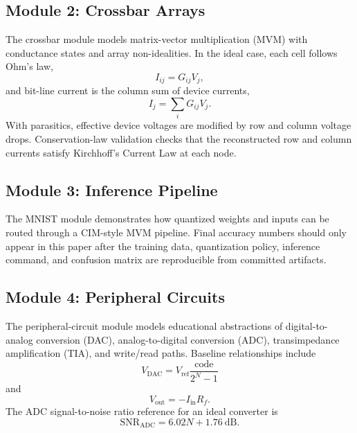 \documentclass[11pt]{article}
\begin{document}
\subsection{Module 2: Crossbar Arrays}

The crossbar module models matrix-vector multiplication (MVM) with conductance states and array non-idealities. In the ideal case, each cell follows Ohm's law,
\begin{equation}
I_{ij} = G_{ij} V_j,
\end{equation}
and bit-line current is the column sum of device currents,
\begin{equation}
I_j = \sum_i G_{ij} V_j.
\end{equation}
With parasitics, effective device voltages are modified by row and column voltage drops. Conservation-law validation checks that the reconstructed row and column currents satisfy Kirchhoff's Current Law at each node.

\subsection{Module 3: Inference Pipeline}

The MNIST module demonstrates how quantized weights and inputs can be routed through a CIM-style MVM pipeline. Final accuracy numbers should only appear in this paper after the training data, quantization policy, inference command, and confusion matrix are reproducible from committed artifacts.

\subsection{Module 4: Peripheral Circuits}

The peripheral-circuit module models educational abstractions of digital-to-analog conversion (DAC), analog-to-digital conversion (ADC), transimpedance amplification (TIA), and write/read paths. Baseline relationships include
\begin{equation}
V_{\mathrm{DAC}} = V_{\mathrm{ref}} \frac{\mathrm{code}}{2^N - 1}
\end{equation}
and
\begin{equation}
V_{\mathrm{out}} = -I_{\mathrm{in}} R_f.
\end{equation}
The ADC signal-to-noise ratio reference for an ideal converter is
\begin{equation}
\mathrm{SNR}_{\mathrm{ADC}} = 6.02N + 1.76 \ \mathrm{dB}.
\end{equation}
\end{document}

